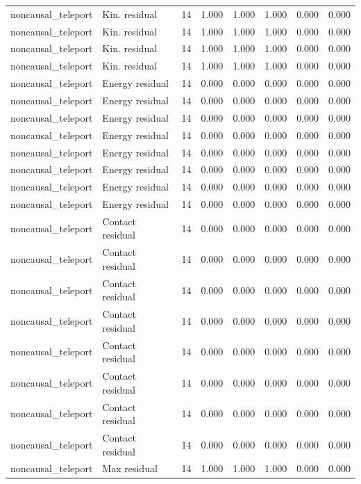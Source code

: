 {\begin{longtable}{llrrrrrr}
noncausal\_teleport & Kin. residual & 14 & 1.000 & 1.000 & 1.000 & 0.000 & 0.000 \\
noncausal\_teleport & Kin. residual & 14 & 1.000 & 1.000 & 1.000 & 0.000 & 0.000 \\
noncausal\_teleport & Kin. residual & 14 & 1.000 & 1.000 & 1.000 & 0.000 & 0.000 \\
noncausal\_teleport & Kin. residual & 14 & 1.000 & 1.000 & 1.000 & 0.000 & 0.000 \\
noncausal\_teleport & Energy residual & 14 & 0.000 & 0.000 & 0.000 & 0.000 & 0.000 \\
noncausal\_teleport & Energy residual & 14 & 0.000 & 0.000 & 0.000 & 0.000 & 0.000 \\
noncausal\_teleport & Energy residual & 14 & 0.000 & 0.000 & 0.000 & 0.000 & 0.000 \\
noncausal\_teleport & Energy residual & 14 & 0.000 & 0.000 & 0.000 & 0.000 & 0.000 \\
noncausal\_teleport & Energy residual & 14 & 0.000 & 0.000 & 0.000 & 0.000 & 0.000 \\
noncausal\_teleport & Energy residual & 14 & 0.000 & 0.000 & 0.000 & 0.000 & 0.000 \\
noncausal\_teleport & Energy residual & 14 & 0.000 & 0.000 & 0.000 & 0.000 & 0.000 \\
noncausal\_teleport & Energy residual & 14 & 0.000 & 0.000 & 0.000 & 0.000 & 0.000 \\
noncausal\_teleport & Contact residual & 14 & 0.000 & 0.000 & 0.000 & 0.000 & 0.000 \\
noncausal\_teleport & Contact residual & 14 & 0.000 & 0.000 & 0.000 & 0.000 & 0.000 \\
noncausal\_teleport & Contact residual & 14 & 0.000 & 0.000 & 0.000 & 0.000 & 0.000 \\
noncausal\_teleport & Contact residual & 14 & 0.000 & 0.000 & 0.000 & 0.000 & 0.000 \\
noncausal\_teleport & Contact residual & 14 & 0.000 & 0.000 & 0.000 & 0.000 & 0.000 \\
noncausal\_teleport & Contact residual & 14 & 0.000 & 0.000 & 0.000 & 0.000 & 0.000 \\
noncausal\_teleport & Contact residual & 14 & 0.000 & 0.000 & 0.000 & 0.000 & 0.000 \\
noncausal\_teleport & Contact residual & 14 & 0.000 & 0.000 & 0.000 & 0.000 & 0.000 \\
noncausal\_teleport & Max residual & 14 & 1.000 & 1.000 & 1.000 & 0.000 & 0.000 \\

\end{longtable}}
